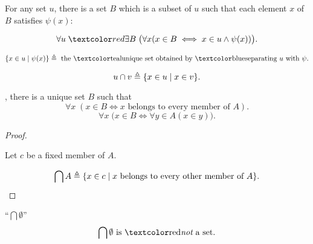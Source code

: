 \begin{frame}{}
  \begin{axiom}
    For any set $u$, there is a set $B$
    which is a subset of $u$ such that each element $x$ of $B$ satisfies $\psi(x)$:

    \[
      \forall u\; \red{\exists B}\; \big( \forall x (x \in B \iff x \in u \land \psi(x)) \big).
    \]
  \end{axiom}

  \begin{definition}
    \[
      \set{x \in u \mid \psi(x)} \triangleq \text{ the \teal{unique} set obtained by \blue{separating} } u \text{ with } \psi.
    \]
  \end{definition}

  \pause
  \begin{definition}[``$u \cap v$'']
    \[
      u \cap v \triangleq \{x \in u \mid x \in v\}.
    \]
  \end{definition}
\end{frame}

\begin{frame}{}
  \begin{theorem}
    , there is a unique set $B$ such that
    \[
      \forall x\; (x \in B \iff x \text{ belongs to every member of } A).
    \]
    \[
      \forall x\; \big(x \in B \iff \forall y \in A (x \in y) \big).
    \]
  \end{theorem}

  \pause
  \begin{proof}
    \begin{center}
      Let $c$ be a fixed member of $A$.
    \end{center}

    \pause
    \vspace{-0.50cm}
    \[
      \bigcap A \triangleq \{x \in c \mid x \text{ belongs to every other member of } A\}.
    \]
  \end{proof}

  \pause
  \begin{alertblock}{``$\bigcap \emptyset$''}
    \[
      \bigcap \emptyset \text{ is \red{\it not} a set}.
    \]
  \end{alertblock}
\end{frame}


